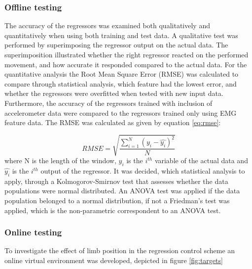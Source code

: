 \begin{multicols}{2}
\subsubsection*{Offline testing}
The accuracy of the regressors was examined both qualitatively and quantitatively when using both training and test data. A qualitative test was performed by superimposing the regressor output on the actual data. The superimposition illustrated whether the right regressor reacted on the performed movement, and how accurate it responded compared to the actual data. For the quantitative analysis the Root Mean Square Error (RMSE) was calculated to compare through statistical analysis, which feature had the lowest error, and whether the regressors were overfitted when tested with new input data. Furthermore, the accuracy of the regressors trained with inclusion of accelerometer data were compared to the regressors trained only using EMG feature data. The RMSE was calculated as given by equation \ref{eq:rmse}:

\begin{equation} \label{eq:rmse}
RMSE = \sqrt{\frac{\sum\limits_{i=1}^N(y_i - \hat{y_i})^2}{N}}
\end{equation}
where N is the length of the window, $y_i$ is the $i^{th}$ variable of the actual data and $\hat{y_i}$ is the $i^{th}$ output of the regressor.
It was decided, which statistical analysis to apply, through a Kolmogorov-Smirnov test that assesses whether the data populations were normal distributed. An ANOVA test was applied if the data population belonged to a normal distribution, if not a Friedman's test was applied, which is the non-parametric correspondent to an ANOVA test.

\subsubsection*{Online testing}
To investigate the effect of limb position in the regression control scheme an online virtual environment was developed, depicted in figure \ref{fig:targets}


\end{multicols}

